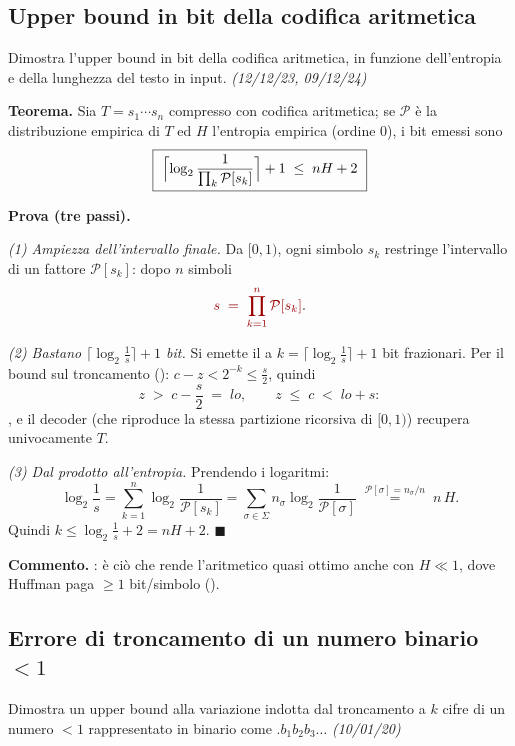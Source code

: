 \subsection*{ Upper bound in bit della codifica aritmetica}

\begin{domanda}
Dimostra l'upper bound in bit della codifica aritmetica, in funzione dell'entropia e della
lunghezza del testo in input. \emph{(12/12/23, 09/12/24)}
\end{domanda}

\textbf{Teorema.} Sia $T=s_1\cdots s_n$ compresso con codifica aritmetica; se $\mathcal{P}$ \`e la
distribuzione empirica di $T$ ed $H$ l'entropia empirica (ordine 0), i bit emessi sono
\[
\boxed{\ \Bigl\lceil\log_2\frac{1}{\prod_{k}\mathcal{P}[s_k]}\Bigr\rceil+1\;\le\;nH+2\ }
\]

\textbf{Prova (tre passi).}

\emph{(1) Ampiezza dell'intervallo finale.} Da $[0,1)$, ogni simbolo $s_k$ restringe l'intervallo
di un fattore $\mathcal{P}[s_k]$: dopo $n$ simboli
\[
\kw{s\;=\;\prod_{k=1}^{n}\mathcal{P}[s_k]}.
\]

\emph{(2) Bastano $\lceil\log_2\frac1s\rceil+1$ bit.} Si emette il  a $k=\lceil\log_2\frac{1}{s}\rceil+1$ bit frazionari. Per il bound
sul troncamento (): $c-z<2^{-k}\le\frac{s}{2}$, quindi
\[
z\;>\;c-\frac{s}{2}\;=\;lo,\qquad z\;\le\;c\;<\;lo+s :
\]
, e il decoder (che riproduce la stessa
partizione ricorsiva di $[0,1)$) recupera univocamente $T$.

\emph{(3) Dal prodotto all'entropia.} Prendendo i logaritmi:
\[
\log_2\frac{1}{s}=\sum_{k=1}^{n}\log_2\frac{1}{\mathcal{P}[s_k]}
=\sum_{\sigma\in\Sigma}n_\sigma\log_2\frac{1}{\mathcal{P}[\sigma]}
\;\overset{\mathcal{P}[\sigma]=n_\sigma/n}{=}\;n\,H .
\]
Quindi $k\le\log_2\frac1s+2=nH+2$. $\blacksquare$

\textbf{Commento.} : \`e ci\`o che
rende l'aritmetico quasi ottimo anche con $H\ll1$, dove Huffman paga $\ge1$ bit/simbolo
().

\subsection*{ Errore di troncamento di un numero binario $<1$}

\begin{domanda}
Dimostra un upper bound alla variazione indotta dal troncamento a $k$ cifre di un numero $<1$
rappresentato in binario come $.b_1b_2b_3\ldots$ \emph{(10/01/20)}
\end{domanda}


